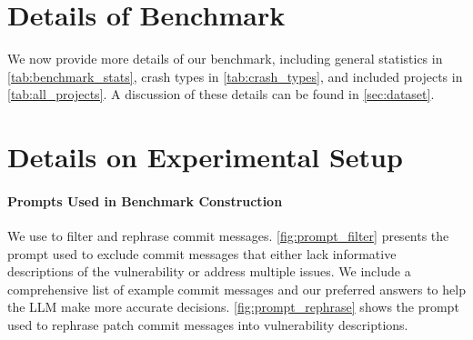 \clearpage


\section{Details of \sysname Benchmark}
\label{app:dataset}
We now provide more details of our benchmark, including general statistics in \cref{tab:benchmark_stats}, crash types in \cref{tab:crash_types}, and included projects in \cref{tab:all_projects}.
A discussion of these details can be found in \cref{sec:dataset}.






\section{Details on Experimental Setup}
\label{app:setup}
\paragraph{Prompts Used in Benchmark Construction}
We use \gptiv to filter and rephrase commit messages.
\cref{fig:prompt_filter} presents the prompt used to exclude commit messages that either lack informative descriptions of the vulnerability or address multiple issues.
We include a comprehensive list of example commit messages and our preferred answers to help the LLM make more accurate decisions.
\cref{fig:prompt_rephrase} shows the prompt used to rephrase patch commit messages into vulnerability descriptions.


